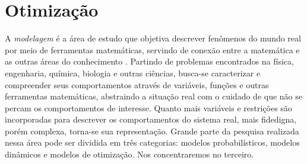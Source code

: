 

\section{Otimização}










A \textit{modelagem} é a área de estudo que objetiva descrever fenômenos do mundo real por meio de ferramentas matemáticas, servindo de conexão entre a matemática e as outras áreas do conhecimento \cite{meerschaert2013mathematical}. Partindo de problemas encontrados na física, engenharia, química, biologia e outras ciências, busca-se caracterizar e compreender seus comportamentos através de variáveis, funções e outras ferramentas matemáticas, abstraindo a situação real com o cuidado de que não se percam os comportamentos de interesse. Quanto mais variáveis e restrições são incorporadas para descrever os comportamentos do sistema real, mais fidedigna, porém complexa, torna-se sua representação. Grande parte da pesquisa realizada nessa área pode ser dividida em três categorias: modelos probabilísticos, modelos dinâmicos e modelos de otimização. Nos concentraremos no terceiro.

